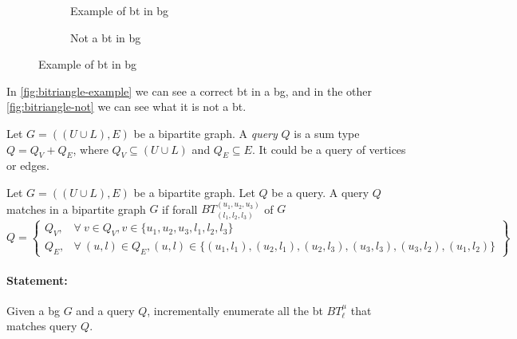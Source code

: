\begin{figure}[htp!]
\begin{subfigure}[b]{0.5\textwidth}
\centering
{}
\caption{Example of \acrshort{bt} in \acrshort{bg}}
\label{fig:bitriangle-example}
\end{subfigure}
\begin{subfigure}[b]{0.5\textwidth}
\centering
{}
\caption{Not a \acrshort{bt} in \acrshort{bg}}
\label{fig:bitriangle-not}
\end{subfigure}
\caption[Example of \acrshort{bt} in \acrshort{bg}]{Example of \acrshort{bt} in \acrshort{bg}}
\end{figure}

In \autoref{fig:bitriangle-example} we can see a correct \acrshort{bt} in a \acrshort{bg}, and in the other \autoref{fig:bitriangle-not} we can see what it is not a \acrshort{bt}.

\begin{definition}[Query]
Let $G=((U\cup L),E)$ be a bipartite graph. 
A \textit{query} $Q$ is a sum type $Q = Q_V + Q_E$, where $Q_V \subseteq (U \cup L)$ and $Q_E \subseteq E$. 
It could be a query of vertices or edges.
\end{definition}

\begin{definition}\label{def:query:match}
  Let $G=((U\cup L),E)$ be a bipartite graph.
  Let $Q$ be a query.
  A query $Q$ matches in a bipartite graph $G$ if forall $BT_{(l_1,l_2,l_3)}^{(u_1,u_2,u_3)}$ of $G$
  \[
    Q = \left\{\begin{array}{lr}
      Q_V, & \forall\ v \in Q_V, v \in \{u_1,u_2,u_3,l_1,l_2,l_3\}\\
      Q_E, & \forall\ (u,l) \in Q_E, (u,l) \in \{(u_1, l_1), (u_2,l_1), (u_2, l_3), (u_3,l_3), (u_3, l_2), (u_1,l_2)\} 
      \end{array}\right\} 
  \]
  \end{definition}
  
\paragraph{Statement:}Given a \acrlong{bg} $G$ and a query $Q$, incrementally enumerate all the \acrlong{bt} $BT_{\ell}^{\mu}$ that matches query $Q$.

